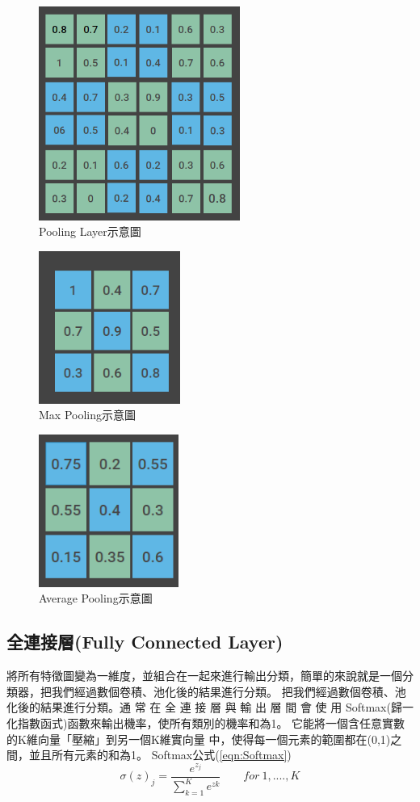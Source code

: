 \begin{figure}[H]
	\centerline{\includegraphics[height=7cm]{pic/pooling 1.PNG}}

	\caption{Pooling Layer示意圖}
	\label{fig:PoolingLayer}
\end{figure}
\begin{figure}[H]
	\centerline{\includegraphics[height=5cm]{pic/poolinig 2.PNG}}
	\caption{Max Pooling示意圖}
	\label{fig:MaxPooling}
\end{figure}
\begin{figure}[H]
	\centerline{\includegraphics[height=5cm]{pic/pooling 3.PNG}}
	\caption{Average Pooling示意圖}
	\label{fig:AveragePooling}
\end{figure}


\subsection{全連接層(Fully Connected Layer)}
將所有特徵圖變為一維度，並組合在一起來進行輸出分類，簡單的來說就是一個分類器，把我們經過數個卷積、池化後的結果進行分類。
把我們經過數個卷積、池化後的結果進行分類。通 常 在 全 連 接 層 與 輸 出 層 間 會 使 用 Softmax(歸一化指數函式)函數來輸出機率，使所有類別的機率和為1。
它能將一個含任意實數的K維向量「壓縮」到另一個K維實向量 中，使得每一個元素的範圍都在(0,1)之間，並且所有元素的和為1。
Softmax公式(\ref{eqn:Softmax})
\begin{equation}
	\label{eqn:Softmax}
	\sigma(z)_j=\frac{e^{z_j}}{\sum_{k=1}^{K}e^{zk}} \ \ \ \ \ \ \ \ \ for\ 1,....,K
\end{equation}


